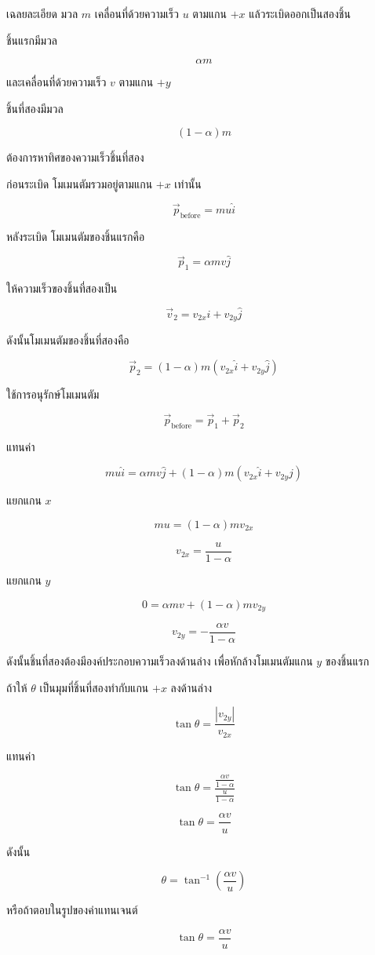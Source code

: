 \begin{examplebox}{เฉลยละเอียด}
มวล $m$ เคลื่อนที่ด้วยความเร็ว $u$ ตามแกน $+x$ แล้วระเบิดออกเป็นสองชิ้น

ชิ้นแรกมีมวล

\[
\alpha m
\]

และเคลื่อนที่ด้วยความเร็ว $v$ ตามแกน $+y$

ชิ้นที่สองมีมวล

\[
(1-\alpha)m
\]

ต้องการหาทิศของความเร็วชิ้นที่สอง

ก่อนระเบิด โมเมนตัมรวมอยู่ตามแกน $+x$ เท่านั้น

\[
\vec{p}_{\text{before}}=mu\hat{i}
\]

หลังระเบิด โมเมนตัมของชิ้นแรกคือ

\[
\vec{p}_1=\alpha mv\hat{j}
\]

ให้ความเร็วของชิ้นที่สองเป็น

\[
\vec{v}_2=v_{2x}\hat{i}+v_{2y}\hat{j}
\]

ดังนั้นโมเมนตัมของชิ้นที่สองคือ

\[
\vec{p}_2=(1-\alpha)m(v_{2x}\hat{i}+v_{2y}\hat{j})
\]

ใช้การอนุรักษ์โมเมนตัม

\[
\vec{p}_{\text{before}}=\vec{p}_1+\vec{p}_2
\]

แทนค่า

\[
mu\hat{i}
=
\alpha mv\hat{j}
+
(1-\alpha)m(v_{2x}\hat{i}+v_{2y}\hat{j})
\]

แยกแกน $x$

\[
mu=(1-\alpha)mv_{2x}
\]

\[
v_{2x}=\frac{u}{1-\alpha}
\]

แยกแกน $y$

\[
0=\alpha mv+(1-\alpha)mv_{2y}
\]

\[
v_{2y}=-\frac{\alpha v}{1-\alpha}
\]

ดังนั้นชิ้นที่สองต้องมีองค์ประกอบความเร็วลงด้านล่าง เพื่อหักล้างโมเมนตัมแกน $y$ ของชิ้นแรก

ถ้าให้ $\theta$ เป็นมุมที่ชิ้นที่สองทำกับแกน $+x$ ลงด้านล่าง

\[
\tan\theta=\frac{|v_{2y}|}{v_{2x}}
\]

แทนค่า

\[
\tan\theta
=
\frac{
\frac{\alpha v}{1-\alpha}
}{
\frac{u}{1-\alpha}
}
\]

\[
\tan\theta=\frac{\alpha v}{u}
\]

ดังนั้น

\[
\boxed{
\theta=\tan^{-1}\left(\frac{\alpha v}{u}\right)
}
\]

หรือถ้าตอบในรูปของค่าแทนเจนต์

\[
\boxed{
\tan\theta=\frac{\alpha v}{u}
}
\]
\end{examplebox}
